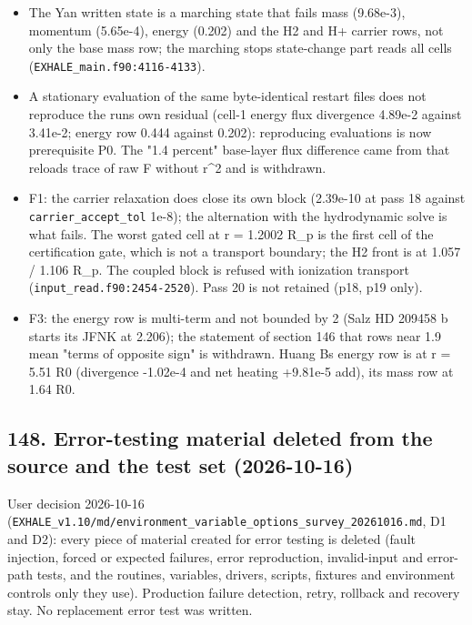 \documentclass[english,a4paper]{my_memo}
\providecommand{\tightlist}{\setlength{\itemsep}{0pt}\setlength{\parskip}{0pt}}
\begin{document}
\begin{itemize}
\tightlist
\item
  The Yan written state is a marching state that fails mass (9.68e-3), momentum (5.65e-4), energy (0.202) and the H2 and H+ carrier rows, not only the base mass row; the marching stop\textquotesingle s state-change part reads all cells (\texttt{EXHALE\_main.f90:4116-4133}).
\item
  A stationary evaluation of the same byte-identical restart files does not reproduce the run\textquotesingle s own residual (cell-1 energy flux divergence 4.89e-2 against 3.41e-2; energy row 0.444 against 0.202): reproducing evaluations is now prerequisite P0. The "1.4 percent" base-layer flux difference came from that reload\textquotesingle s trace of raw F without r\^{}2 and is withdrawn.
\item
  F1: the carrier relaxation does close its own block (2.39e-10 at pass 18 against \texttt{carrier\_accept\_tol} 1e-8); the alternation with the hydrodynamic solve is what fails. The worst gated cell at r = 1.2002 R\_p is the first cell of the certification gate, which is not a transport boundary; the H2 front is at 1.057 / 1.106 R\_p. The coupled block is refused with ionization transport (\texttt{input\_read.f90:2454-2520}). Pass 20 is not retained (p18, p19 only).
\item
  F3: the energy row is multi-term and not bounded by 2 (Salz HD 209458 b starts its JFNK at 2.206); the statement of section 146 that rows near 1.9 mean "terms of opposite sign" is withdrawn. Huang B\textquotesingle s energy row is at r = 5.51 R0 (divergence -1.02e-4 and net heating +9.81e-5 add), its mass row at 1.64 R0.
\end{itemize}

\subsection{148. Error-testing material deleted from the source and the test set (2026-10-16)}\label{148-error-testing-material-deleted-from-the-source-and-the-test-set-2026-10-16}

User decision 2026-10-16 (\texttt{EXHALE\_v1.10/md/environment\_variable\_options\_survey\_20261016.md}, D1 and D2): every piece of material created for error testing is deleted (fault injection, forced or expected failures, error reproduction, invalid-input and error-path tests, and the routines, variables, drivers, scripts, fixtures and environment controls only they use). Production failure detection, retry, rollback and recovery stay. No replacement error test was written.
\end{document}
